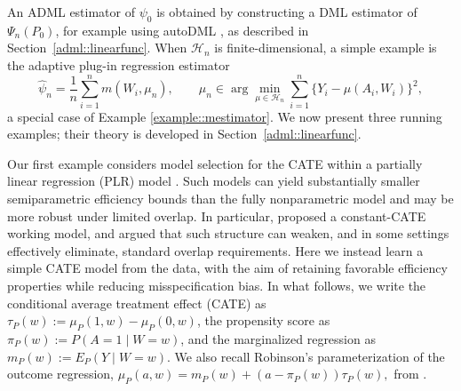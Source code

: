 \documentclass[11pt]{article}
\theoremstyle{definition}
\begin{document}
 


An ADML estimator of \(\psi_0\) is obtained by constructing a DML estimator of \(\Psi_n(P_0)\), for example using autoDML \citep{chernozhukov2022automatic}, as described in Section~\ref{adml::linearfunc}. When \(\mathcal{H}_n\) is finite-dimensional, a simple example is the adaptive plug-in regression estimator
\begin{equation}
\label{eqn::pluginadml}
\widehat{\psi}_n=\frac{1}{n}\sum_{i=1}^n m(W_i,\mu_n), \qquad
\mu_n \in \arg\min_{\mu \in \mathcal{H}_n}\sum_{i=1}^n \{Y_i-\mu(A_i,W_i)\}^2,
\end{equation}
a special case of Example \ref{example::mestimator}. We now present three running examples; their theory is developed in Section~\ref{adml::linearfunc}.


Our first example considers model selection for the CATE within a partially linear regression (PLR) model \citep{robinson1988root, imbensOverlapEstimand2006, li2019overlapWeights}. Such models can yield substantially smaller semiparametric efficiency bounds than the fully nonparametric model and may be more robust under limited overlap. In particular, \cite{imbensOverlapEstimand2006} proposed a constant-CATE working model, and \cite{li2019overlapWeights} argued that such structure can weaken, and in some settings effectively eliminate, standard overlap requirements. Here we instead learn a simple CATE model from the data, with the aim of retaining favorable efficiency properties while reducing misspecification bias. In what follows, we write the conditional average treatment effect (CATE) as \(\tau_P(w):=\mu_P(1,w)-\mu_P(0,w)\), the propensity score as \(\pi_P(w):=P(A=1 \mid W=w)\), and the marginalized regression as \(m_P(w):=E_P(Y \mid W=w)\). We also recall Robinson's parameterization of the outcome regression, $\mu_P(a,w) = m_P(w) + (a - \pi_P(w))\tau_P(w),$
from \cite{robinson1988root}.
\end{document}
